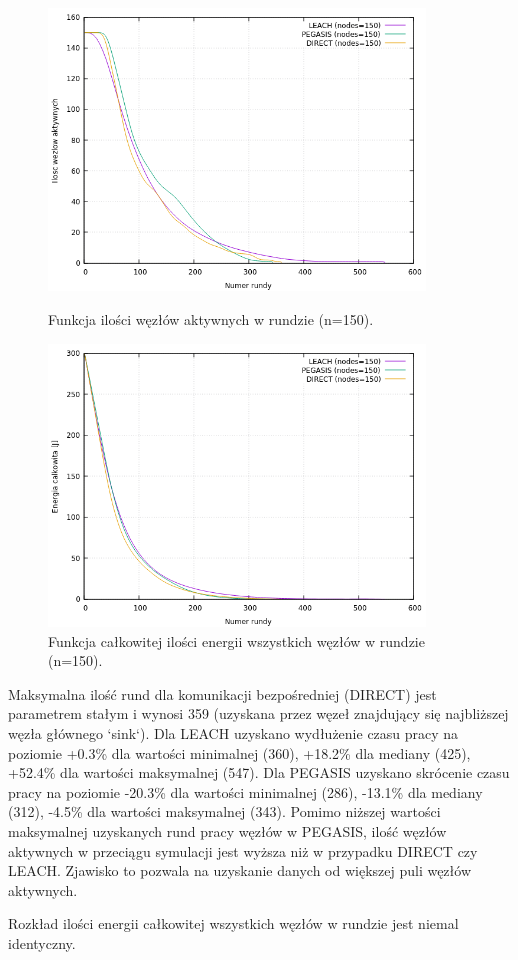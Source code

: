 \documentclass[a4paper,12pt,twoside,openany]{report}
\begin{document}
\begin{figure}[H]
 \centering
 \includegraphics[width=10cm]{images/gnuplot/test_2/nodes_in_round_150.png}
 \caption{Funkcja ilości węzłów aktywnych w rundzie (n=150).}
 \includegraphics[width=10cm]{images/gnuplot/test_2/energy_in_round_150.png}
 \caption{Funkcja całkowitej ilości energii wszystkich węzłów w rundzie (n=150).}
\end{figure}

\par
Maksymalna ilość rund dla komunikacji bezpośredniej (DIRECT) jest parametrem stałym i wynosi 359 (uzyskana przez węzeł znajdujący się najbliższej węzła głównego `sink`).
Dla LEACH uzyskano wydłużenie czasu pracy na poziomie +0.3\% dla wartości minimalnej (360), +18.2\% dla mediany (425), +52.4\% dla wartości maksymalnej (547).
Dla PEGASIS uzyskano skrócenie czasu pracy na poziomie -20.3\% dla wartości minimalnej (286), -13.1\% dla mediany (312), -4.5\% dla wartości maksymalnej (343).
Pomimo niższej wartości maksymalnej uzyskanych rund pracy węzłów w PEGASIS, ilość węzłów aktywnych w przeciągu symulacji jest wyższa niż w przypadku DIRECT czy LEACH.
Zjawisko to pozwala na uzyskanie danych od większej puli węzłów aktywnych.
\par
Rozkład ilości energii całkowitej wszystkich węzłów w rundzie jest niemal identyczny.
\end{document}
